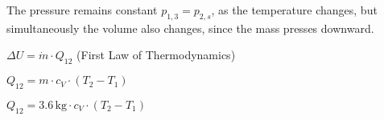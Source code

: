 The pressure remains constant \( p_{1,3} = p_{2,s} \), as the temperature changes, but simultaneously the volume also changes, since the mass presses downward.  

\(\Delta U = \dot{m} \cdot Q_{12}\) (First Law of Thermodynamics)  

\(Q_{12} = m \cdot c_V \cdot (T_2 - T_1)\)  

\(Q_{12} = 3.6 \, \text{kg} \cdot c_V \cdot (T_2 - T_1)\)